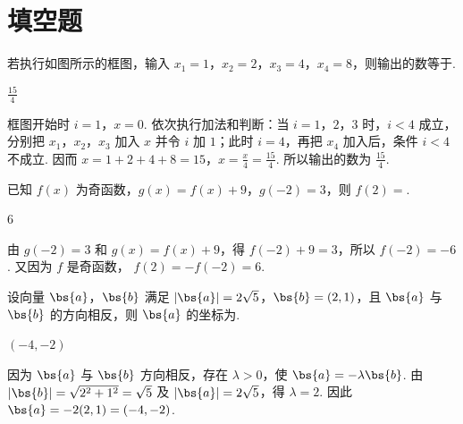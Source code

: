 \section{填空题}

\begin{problem}
若执行如图所示的框图，输入 \(x_{1} = 1\)，\(x_{2} = 2\)，\(x_{3} = 4\)，\(x_{4} = 8\)，则输出的数等于\fillinblank{}.

\end{problem}

\begin{answer}
\(\frac{15}{4}\)
\end{answer}

\begin{solution}
框图开始时 \(i=1\)，\(x=0\). 依次执行加法和判断：当 \(i=1\)，\(2\)，\(3\) 时，\(i<4\) 成立，分别把 \(x_1\)，\(x_2\)，\(x_3\) 加入 \(x\) 并令 \(i\) 加 \(1\)；此时 \(i=4\)，再把 \(x_4\) 加入后，条件 \(i<4\) 不成立. 因而
\(x=1+2+4+8=15\)，\(x=\frac{x}{4}=\frac{15}{4}\).
所以输出的数为 \(\frac{15}{4}\).
\end{solution}

\begin{problem}
已知 \( f(x) \) 为奇函数，\( g(x) = f(x) + 9 \)，\( g(-2) = 3 \)，则 \( f(2) = \)\fillinblank{}.
\end{problem}

\begin{answer}
6
\end{answer}

\begin{solution}
由 \(g(-2)=3\) 和 \(g(x)=f(x)+9\)，得
\(f(-2)+9=3\)，所以 \(f(-2)=-6\). 又因为 \(f\) 是奇函数，
\(f(2)=-f(-2)=6\).
\end{solution}

\begin{problem}
设向量 \(\bs{a}\)，\(\bs{b}\) 满足 \(|\bs{a}| = 2\sqrt{5}\)，\(\bs{b} = (2, 1)\)，且 \(\bs{a}\) 与 \(\bs{b}\) 的方向相反，则 \(\bs{a}\) 的坐标为\fillinblank{}.
\end{problem}

\begin{answer}
\((-4,-2)\)
\end{answer}

\begin{solution}
因为 \(\bs{a}\) 与 \(\bs{b}\) 方向相反，存在 \(\lambda>0\)，使
\(\bs{a}=-\lambda\bs{b}\). 由 \(|\bs{b}|=\sqrt{2^2+1^2}=\sqrt5\) 及
\(|\bs{a}|=2\sqrt5\)，得 \(\lambda=2\). 因此
\(\bs{a}=-2(2,1)=(-4,-2)\).
\end{solution}

